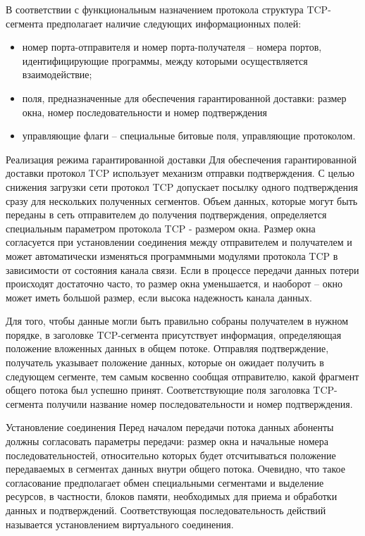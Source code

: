 В соответствии с функциональным назначением протокола структура TCP-сегмента предполагает наличие следующих информационных полей:

\begin{itemize}
\item номер порта-отправителя и номер порта-получателя – номера портов, идентифицирующие программы, между которыми осуществляется взаимодействие;
\item поля, предназначенные для обеспечения гарантированной доставки: размер окна, номер последовательности и номер подтверждения 
\item управляющие флаги – специальные битовые поля, управляющие протоколом. 
\end{itemize}

Реализация режима гарантированной доставки
Для обеспечения гарантированной доставки протокол TCP использует механизм отправки подтверждения. С целью снижения загрузки сети протокол TCP допускает посылку одного подтверждения сразу для нескольких полученных сегментов. Объем данных, которые могут быть переданы в сеть отправителем до получения подтверждения, определяется специальным параметром протокола TCP - размером окна. Размер окна согласуется при установлении соединения между отправителем и получателем и может автоматически изменяться программными модулями протокола TCP в зависимости от состояния канала связи. Если в процессе передачи данных потери происходят достаточно часто, то размер окна уменьшается, и наоборот – окно может иметь большой размер, если высока надежность канала данных. 

Для того, чтобы данные могли быть правильно собраны получателем в нужном порядке, в заголовке TCP-сегмента присутствует информация, определяющая положение вложенных данных в общем потоке. Отправляя подтверждение, получатель указывает положение данных, которые он ожидает получить в следующем сегменте, тем самым косвенно сообщая отправителю, какой фрагмент общего потока был успешно принят. Соответствующие поля заголовка TCP-сегмента получили название номер последовательности и номер подтверждения.

Установление соединения
Перед началом передачи потока данных абоненты должны согласовать параметры передачи: размер окна и начальные номера последовательностей, относительно которых будет отсчитываться положение передаваемых в сегментах данных внутри общего потока. Очевидно, что такое согласование предполагает обмен специальными сегментами и выделение ресурсов, в частности, блоков памяти, необходимых для приема и обработки данных и подтверждений. Соответствующая последовательность действий называется установлением виртуального соединения.

